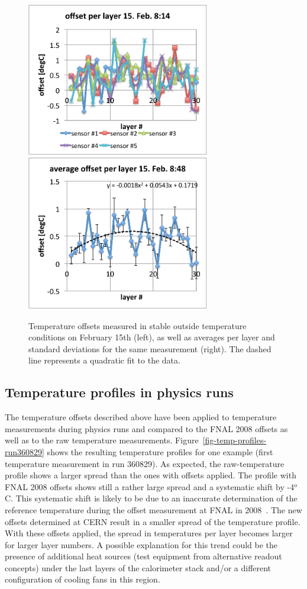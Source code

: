\documentclass[a4paper,10pt]{article}
\begin{document}
\begin{figure}[t]
\label{fig-offsets-smallspreads}
\centering
\includegraphics[width=8cm]{offset-per-layer-15-feb-8_48.pdf}
\includegraphics[width=8cm]{average-offset-per-layer-15-feb-8_48.pdf}
\caption{Temperature offsets measured in stable outside temperature conditions
on February 15th (left), as well as averages per layer
and standard deviations for the same measurement (right). 
The dashed line represents a quadratic fit to the data.}
\end{figure}

\subsection{Temperature profiles in physics runs}
The temperature offsets described above have been applied to temperature measurements during
physics runs and compared to the FNAL 2008 offsets as well as to the raw temperature measurements.
Figure~\ref{fig-temp-profiles-run360829} shows the resulting temperature profiles for one example (first 
temperature measurement in run 360829). As expected, the raw-temperature profile shows a larger spread
than the ones with offsets applied. The profile with FNAL 2008 offsets shows still a rather large spread
and a systematic shift by -4$^o$C. This systematic shift is likely to be due to an inaccurate determination
of the reference temperature during the offset measurement at FNAL in 2008~\cite{sven-karstensen-private}.   
The new offsets determined at CERN result in a smaller spread of the temperature profile. With these offsets
applied, the spread in temperatures per layer becomes larger for larger layer numbers. A possible explanation
for this trend could be the presence of additional heat sources (test equipment from alternative readout concepts)
under the last layers of the calorimeter stack and/or a different configuration of cooling fans in this region.
 
\end{document}
